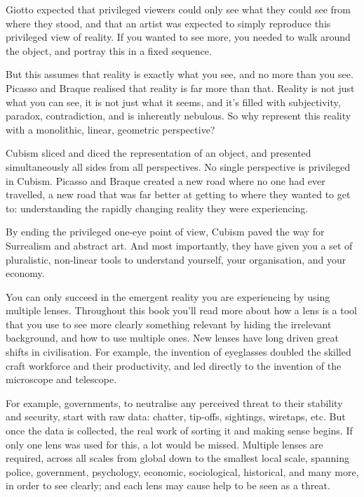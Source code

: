Giotto expected that privileged viewers could only see what they could see from where they stood, and that an artist was expected to simply reproduce this privileged view of reality. If you wanted to see more, you needed to walk around the object, and portray this in a fixed sequence.


But this assumes that reality is exactly what you see, and no more than you see. Picasso and Braque realised that reality is far more than that. Reality is not just what you can see, it is not just what it seems, and it's filled with subjectivity, paradox, contradiction, and is inherently nebulous. So why represent this reality with a monolithic, linear, geometric perspective?


Cubism sliced and diced the representation of an object, and presented simultaneously all sides from all perspectives. No single perspective is privileged in Cubism. Picasso and Braque created a new road where no one had ever travelled, a new road that was far better at getting to where they wanted to get to: understanding the rapidly changing reality they were experiencing. 


By ending the privileged one-eye point of view, Cubism paved the way for Surrealism and abstract art. And most importantly, they have given you a set of pluralistic, non-linear tools to understand yourself, your organisation, and your economy.


You can only succeed in the emergent reality you are experiencing by using multiple lenses. Throughout this book you'll read more about how a lens is a tool that you use to see more clearly something relevant by hiding the irrelevant background, and how to use multiple ones. New lenses have long driven great shifts in civilisation. For example, the invention of eyeglasses doubled the skilled craft workforce and their productivity, and led directly to the invention of the microscope and telescope\cite{landes-wealth-and-poverty}.


For example, governments, to neutralise any perceived threat to their stability and security, start with raw data: chatter, tip-offs, sightings, wiretaps, etc. But once the data is collected, the real work of sorting it and making sense begins\cite{townsend-desperate}. If only one lens was used for this, a lot would be missed. Multiple lenses are required, across all scales from global down to the smallest local scale, spanning police, government, psychology, economic, sociological, historical, and many more, in order to see clearly; and each lens may cause help to be seen as a threat.


